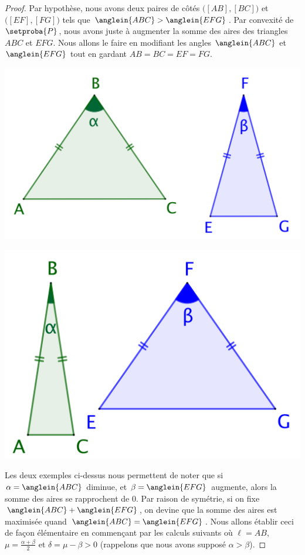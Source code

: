 \begin{proof}
	Par hypothèse, nous avons deux paires de côtés 
	$\big( [AB] , [BC] \big)$ et 
	$\big( [EF] , [FG] \big)$ tels que 
	$\anglein{ABC} > \anglein{EFG}$.
	Par convexité de $\setproba{P}$, nous avons juste à augmenter la somme des aires des triangles $ABC$ et $EFG$.
	Nous allons le faire en modifiant les angles $\anglein{ABC}$ et $\anglein{EFG}$ tout en gardant $AB = BC = EF = FG$.
	\begin{multicols}{2}
		\centering

		\includegraphics[scale=.4]{content/polygon/2-eq-angles-1.png}

		\includegraphics[scale=.4]{content/polygon/2-eq-angles-2.png}
	\end{multicols}

	Les deux exemples ci-dessus nous permettent de noter que si $\alpha = \anglein{ABC}$ diminue, et $\beta = \anglein{EFG}$ augmente, alors la somme des aires se rapprochent de $0$.
	Par raison de symétrie, si on fixe $\anglein{ABC} + \anglein{EFG}$, on devine que la somme des aires est maximisée quand $\anglein{ABC} = \anglein{EFG}$.
	Nous allons établir ceci de façon élémentaire en commençant par les calculs suivants où 
	$\ell = AB$, 
	$\mu = \frac{\alpha + \beta}{2}$ et 
	$\delta = \mu - \beta > 0$ (rappelons que nous avons supposé $\alpha > \beta$). 
	

\end{proof}
